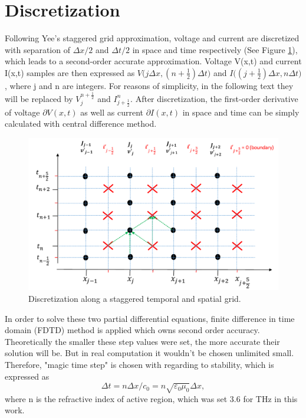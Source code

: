 \documentclass[11pt,final]{scrbook}
\begin{document}
\section{Discretization}
Following Yee’s staggered grid approximation\cite{yee1966numerical}, voltage and current are discretized with separation of $\Delta x/2$ and $\Delta t/2$ in space and time respectively (See Figure \ref{fig:Discretisation}), which leads to a second-order accurate approximation. Voltage V(x,t) and current I(x,t) samples are then expressed as $ V\big(j\Delta x, (n+\frac{1}{2})\Delta t\big)$ and $ I\big((j+\frac{1}{2})\Delta x, n\Delta t\big)$, where j and n are integers. For reasons of simplicity, in the following text they will be replaced by $ V _{ j }^{ n+\frac{1}{2}}$ and ${ I }_{ j+\frac{1}{2} }^{ n }$. After discretization, the first-order derivative of voltage $\partial V(x,t)$ as well as current $\partial I(x,t)$ in space and time can be simply calculated with central difference method\cite{yang2012central}. 
\begin{figure}[htbp]
\begin{center}
\includegraphics[scale=0.6]{images/Discretization}
\caption{Discretization along a staggered temporal and spatial grid.}
\label{fig:Discretisation}
\end{center}
\end{figure}

In order to solve these two partial differential equations, finite difference in time domain (FDTD) method is applied which owns second order accuracy. Theoretically the smaller these step values were set, the more accurate their solution will be. But in real computation it wouldn't be chosen unlimited small. Therefore, "magic time step" \cite{li1992simulation} is chosen with regarding to stability, which is expressed as
\begin{equation}
\Delta t=n\Delta x/c_{0}=n\sqrt{\varepsilon_{0}\mu_{0}}\Delta x,
\end{equation}
where n is the refractive index of active region, which was set 3.6 for THz in this work.
\end{document}
